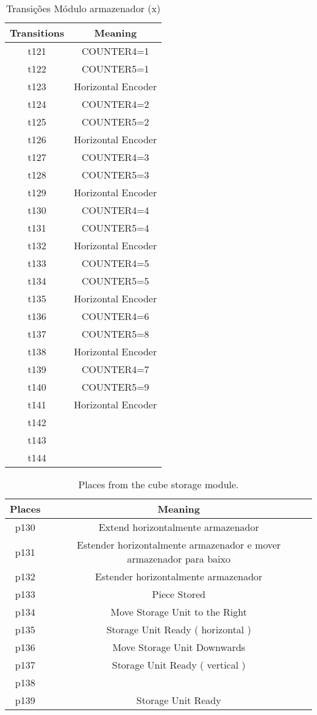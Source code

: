 \begin{table}[htbp]
\caption{Transições Módulo armazenador (x)}
\centering
\begin{tabular}{c|c}
Transitions & Meaning\\
\hline
t121 & COUNTER4=1\\
t122 & COUNTER5=1\\
t123 & Horizontal Encoder\\
t124 & COUNTER4=2\\
t125 & COUNTER5=2\\
t126 & Horizontal Encoder\\
t127 & COUNTER4=3\\
t128 & COUNTER5=3\\
t129 & Horizontal Encoder\\
t130 & COUNTER4=4\\
t131 & COUNTER5=4\\
t132 & Horizontal Encoder\\
t133 & COUNTER4=5\\
t134 & COUNTER5=5\\
t135 & Horizontal Encoder\\
t136 & COUNTER4=6\\
t137 & COUNTER5=8\\
t138 & Horizontal Encoder\\
t139 & COUNTER4=7\\
t140 & COUNTER5=9\\
t141 & Horizontal Encoder\\
t142 & \\
t143 & \\
t144 & \\
\end{tabular}
\end{table}
\begin{table}[htbp]
\caption{Places from the cube storage module.}
\centering
\begin{tabular}{c|c}
Places & Meaning\\
\hline
p130 & Extend horizontalmente armazenador\\
p131 & Estender horizontalmente armazenador e mover armazenador para baixo\\
p132 & Estender horizontalmente armazenador\\
p133 & Piece Stored\\
p134 & Move Storage Unit to the Right\\
p135 & Storage Unit Ready ( horizontal )\\
p136 & Move Storage Unit Downwards\\
p137 & Storage Unit Ready ( vertical )\\
p138 & \\
p139 & Storage Unit Ready\\
\end{tabular}
\end{table}

